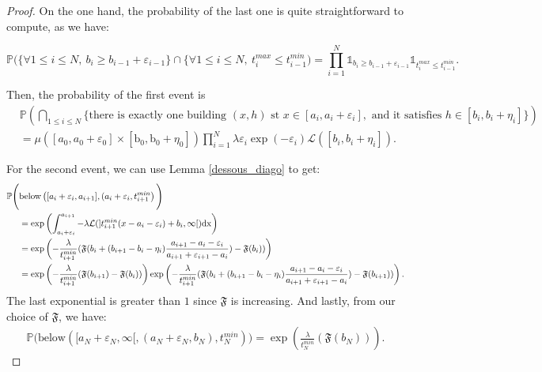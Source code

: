 \documentclass[10pt,english,a4paper]{smfart}
\theoremstyle{definition}
\theoremstyle{remark}
\newcommand{\below}[3]{\mathrm{below}\left(#1, #2, #3\right)}
\newcommand{\primi}{\mathfrak{F}}
\newcommand{\p}{\mathbb{P}}
\renewcommand{\epsilon}{\varepsilon}
\begin{document}
\begin{proof}
On the one hand, the probability of the last one is quite straightforward to compute, as we have:

\[\p\Biggl(\{\forall 1\leq i\leq N, \ b_i\geq b_{i-1}+\epsilon_{i-1}\}\cap \{\forall 1\leq i\leq N, \ t^{max}_i \leq t^{min}_{i-1}\Biggl) = \prod_{i=1}^{N}\mathds{1}_{b_i\geq b_{i-1}+\epsilon_{i-1}}\mathds{1}_{t^{max}_i \leq t^{min}_{i-1}}.\]

Then, the probability of the first event is
\begin{align*}
&\p\left( \bigcap_{1\leq i \leq N} \{\text{there is exactly one building }(x, h)\text{ st }x \in [a_i, a_i+\epsilon_i],\text{ and it satisfies } h\in [b_i, b_i +\eta_i]\}\right)\\
&= \mu([a_0, a_0+\epsilon_0]\times [\mathrm{b}_0, \mathrm{b}_0+\eta_0])\prod_{i = 1}^{N} \lambda\epsilon_i \exp(-\epsilon_i) \mathcal{L}([b_i, b_i +\eta_i]).
\end{align*}

For the second event, we can use Lemma \ref{dessous_diago} to get:
\begin{align*}
    \p\Biggl(&\below{[a_i+\epsilon_i, a_{i+1}]}{(a_i+\epsilon_i}{t^{min}_{i+1}}\Biggl) \\
    &= \exp \left(\displaystyle\int_{a_i+\epsilon_i}^{a_{i+1}} -\lambda \mathcal{L}(]t^{min}_{i+1} (x-a_i-\epsilon_i)+b_i, \infty[) \rm{d}x\right)\\
    &=  \exp \left( -\frac{\lambda}{t^{min}_{i+1}} ( \primi(b_i + (b_{i+1} - b_i -\eta_i)\frac{a_{i+1}-a_i-\epsilon_i}{a_{i+1}+\epsilon_{i+1}-a_i})-\primi (b_i))\right)\\
    &= \exp \left( -\frac{\lambda}{t^{min}_{i+1}} ( \primi(b_{i+1} )-\primi (b_i))\right)\exp \left( -\frac{\lambda}{t^{min}_{i+1}} ( \primi(b_i + (b_{i+1} - b_i -\eta_i)\frac{a_{i+1}-a_i-\epsilon_i}{a_{i+1}+\epsilon_{i+1}-a_i})-\primi (b_{i+1}))\right).
\end{align*}
The last exponential is greater than $1$ since $\primi$ is increasing.
And lastly, from our choice of $\primi$, we have:
\begin{align*}
    \p\Biggl(\below{[a_N+\epsilon_N, \infty[}{(a_N+\epsilon_N, b_N)}{t^{min}_N}\Biggl) = \exp \left(\frac{\lambda}{t^{min}_{N}} ( \primi(b_{N} ))\right).
\end{align*}


\end{proof}
\end{document}
